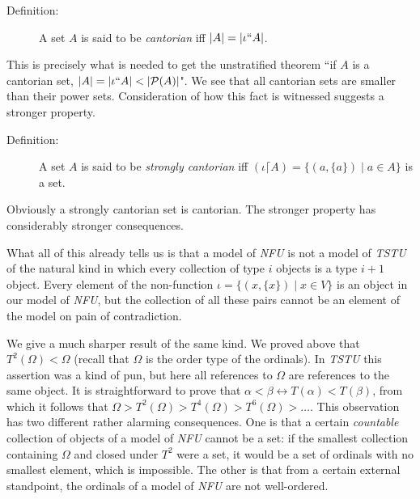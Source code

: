 \documentclass[12pt]{book}
\begin{document}
\begin{description}

\item[Definition:]  A set $A$ is said to be {\em cantorian\/} iff $|A| = |\iota``A|$.

\end{description}

This is precisely what is needed to get the unstratified theorem ``if $A$ is a cantorian set, $|A|=|\iota``A|<|{\cal P}(A)|$".  We see that all cantorian sets are smaller than their power sets.  Consideration of how this fact is witnessed suggests a stronger property.

\begin{description}

\item[Definition:]  A set $A$ is said to be {\em strongly cantorian\/} iff $(\iota \lceil A) = \{(a,\{a\}) \mid a \in A\}$ is a set.

\end{description}

Obviously a strongly cantorian set is cantorian.  The stronger property has considerably stronger consequences.

What all of this already tells us is that a model of {\em NFU\/} is not a model of {\em TSTU\/} of the natural kind in which every collection of type $i$ objects is a type $i+1$ object.  Every element of the non-function $\iota = \{(x,\{x\}) \mid x \in V\}$ is an object in our model of
{\em NFU\/}, but the collection of all these pairs cannot be an element of the model on pain of contradiction.

We give a much sharper result of the same kind.  We proved above that $T^2(\Omega) < \Omega$ (recall that $\Omega$ is the order type of the ordinals).  In {\em TSTU\/} this assertion was a kind of pun, but here all references to $\Omega$ are references to the same object.
It is straightforward to prove that $\alpha<\beta \leftrightarrow T(\alpha)<T(\beta)$, from which it follows that $\Omega > T^2(\Omega) > T^4(\Omega)>T^6(\Omega)>\ldots$.  This observation has two different rather alarming consequences.  One is that a certain {\em countable\/}
collection of objects of a model of {\em NFU\/} cannot be a set:  if the smallest collection containing $\Omega$ and closed under $T^2$ were a set, it would be a set of ordinals with no smallest element, which is impossible.  The other is that from a certain external standpoint, the ordinals
of a model of {\em NFU\/} are not well-ordered.
\end{document}
